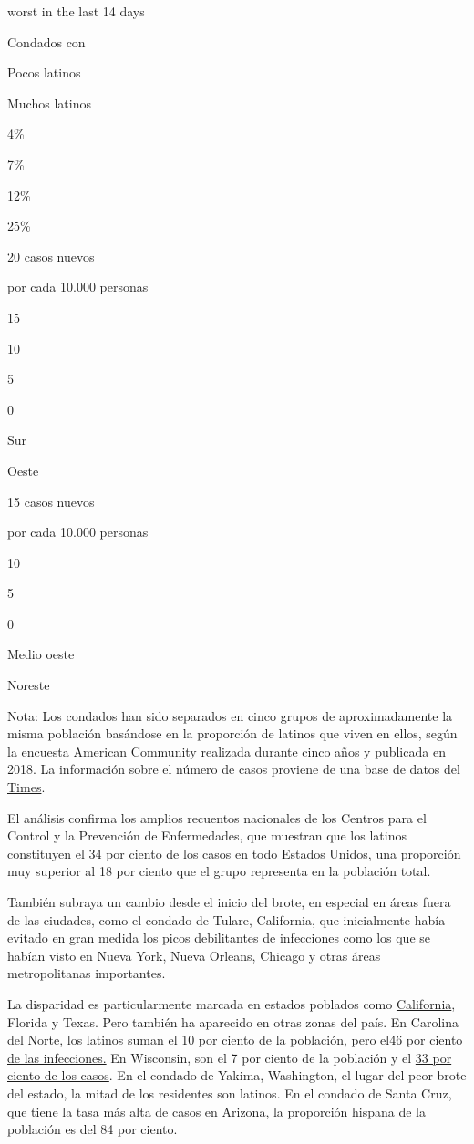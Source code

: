 worst in the last 14 days

Condados con

Pocos latinos

Muchos latinos

4\%

7\%

12\%

25\%

20 casos nuevos

por cada 10.000 personas

15

10

5

0

Sur

Oeste

15 casos nuevos

por cada 10.000 personas

10

5

0

Medio oeste

Noreste

Nota: Los condados han sido separados en cinco grupos de aproximadamente
la misma población basándose en la proporción de latinos que viven en
ellos, según la encuesta American Community realizada durante cinco años
y publicada en 2018. La información sobre el número de casos proviene de
una base de datos del
\href{https://www.nytimes3xbfgragh.onion/interactive/2020/us/coronavirus-us-cases.html}{Times}.

El análisis confirma los amplios recuentos nacionales de los Centros
para el Control y la Prevención de Enfermedades, que muestran que los
latinos constituyen el 34 por ciento de los casos en todo Estados
Unidos, una proporción muy superior al 18 por ciento que el grupo
representa en la población total.

También subraya un cambio desde el inicio del brote, en especial en
áreas fuera de las ciudades, como el condado de Tulare, California, que
inicialmente había evitado en gran medida los picos debilitantes de
infecciones como los que se habían visto en Nueva York, Nueva Orleans,
Chicago y otras áreas metropolitanas importantes.

La disparidad es particularmente marcada en estados poblados como
\href{https://www.cdph.ca.gov/Programs/CID/DCDC/Pages/COVID-19/Race-Ethnicity.aspx}{California},
Florida y Texas. Pero también ha aparecido en otras zonas del país. En
Carolina del Norte, los latinos suman el 10 por ciento de la población,
pero el\href{https://covid19.ncdhhs.gov/dashboard/cases}{46 por ciento
de las infecciones.} En Wisconsin, son el 7 por ciento de la población y
el
\href{https://madison.com/wsj/news/local/health-med-fit/black-latino-covid-19-disparities-bring-attention-to-broad-health-inequities/article_4b5f367c-6b0a-58db-a711-046c4008b66d.html\#tracking-source=home-top-story-1}{33
por ciento de los casos}. En el condado de Yakima, Washington, el lugar
del peor brote del estado, la mitad de los residentes son latinos. En el
condado de Santa Cruz, que tiene la tasa más alta de casos en Arizona,
la proporción hispana de la población es del 84 por ciento.

